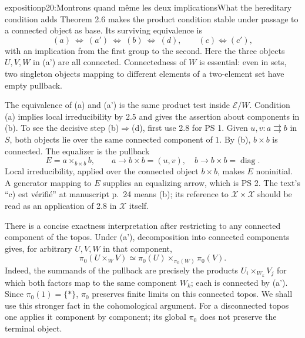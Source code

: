 \begin{dcomment}{exposition}{p20:Montrons quand même les deux implications}{What the hereditary condition adds}
Theorem 2.6 makes the product condition stable under passage to a connected object as base. Its surviving equivalence is
\[
 (a)\ \Longleftrightarrow\ (a')\ \Longleftrightarrow\ (b)
 \ \Longleftrightarrow\ (d),
 \qquad (c)\Longleftrightarrow(c'),
\]
with an implication from the first group to the second. Here the three objects $U,V,W$ in (a') are all connected. Connectedness of $W$ is essential: even in sets, two singleton objects mapping to different elements of a two-element set have empty pullback.

The equivalence of (a) and (a') is the same product test inside $\mathcal E/W$. Condition (a) implies local irreducibility by 2.5 and gives the assertion about components in (b). To see the decisive step (b)$\Rightarrow$(d), first use 2.8 for PS 1. Given $u,v:a\rightrightarrows b$ in $S$, both objects lie over the same connected component of $1$. By (b), $b\times b$ is connected. The equalizer is the pullback
\[
 E=a\times_{b\times b}b,
 \qquad a\longrightarrow b\times b=(u,v),\quad
 b\longrightarrow b\times b=\operatorname{diag}.
\]
Local irreducibility, applied over the connected object $b\times b$, makes $E$ noninitial. A generator mapping to $E$ supplies an equalizing arrow, which is PS 2. The text's ``c) est vérifié'' at manuscript p.~24 means (b); its reference to $\mathcal X\times\mathcal X$ should be read as an application of 2.8 in $\mathcal X$ itself.

There is a concise exactness interpretation after restricting to any connected component of the topos. Under (a'), decomposition into connected components gives, for arbitrary $U,V,W$ in that component,
\[
 \pi _0(U\times_WV)
 \simeq\pi _0(U)\times_{\pi _0(W)}\pi _0(V).
\]
Indeed, the summands of the pullback are precisely the products $U_i\times_{W_k}V_j$ for which both factors map to the same component $W_k$; each is connected by (a'). Since $\pi _0(1)=\{*\}$, $\pi _0$ preserves finite limits on this connected topos. We shall use this stronger fact in the cohomological argument. For a disconnected topos one applies it component by component; its global $\pi _0$ does not preserve the terminal object.
\end{dcomment}

